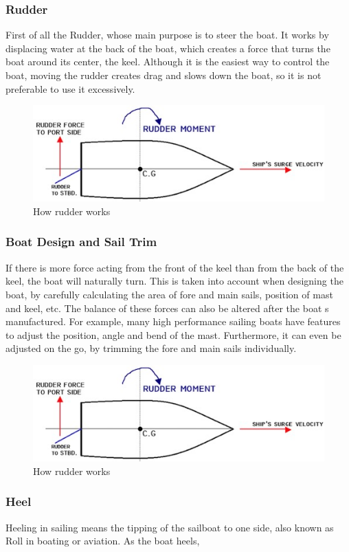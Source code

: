 \documentclass[12pt,twoside]{report}
\begin{document}
\subsubsection{Rudder}
First of all the Rudder, whose main purpose is to steer the boat. It works by displacing water at the back of the boat, which creates a force that turns the boat around its center, the keel. Although it is the easiest way to control the boat, moving the rudder creates drag and slows down the boat, so it is not preferable to use it excessively.

\begin{figure}[h]
\centering
\includegraphics[width = 0.5\hsize]{figures/sailing/rudder.jpg}
\caption{How rudder works \cite{rudder}}
\label{fig:rudders}
\end{figure}

\subsubsection{Boat Design and Sail Trim}
If there is more force acting from the front of the keel than from the back of the keel, the boat will naturally turn. This is taken into account when designing the boat, by carefully calculating the area of fore and main sails, position of mast and keel, etc. The balance of these forces can also be altered after the boat s manufactured. For example, many high performance sailing boats have features to adjust the position, angle and bend of the mast. Furthermore, it can even be adjusted on the go, by trimming the fore and main sails individually.

\begin{figure}[h]
\centering
\includegraphics[width = 0.6\hsize]{figures/sailing/rudder.jpg}
\caption{How rudder works \cite{rudder}}
\label{fig:rudders}
\end{figure}

\subsubsection{Heel}
Heeling in sailing means the tipping of the sailboat to one side, also known as Roll in boating or aviation. As the boat heels, 
\end{document}
